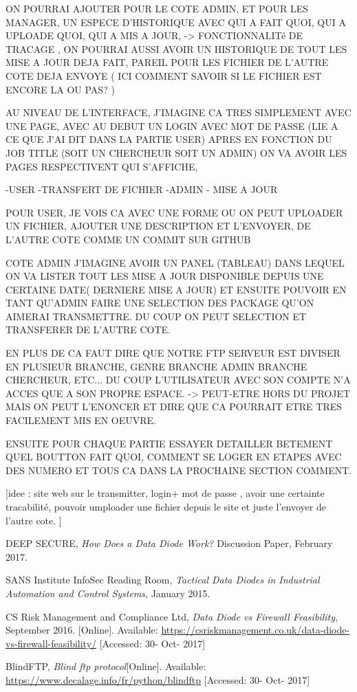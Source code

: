 \documentclass[a4paper,10pt]{article}
\begin{document}
ON POURRAI AJOUTER POUR LE COTE ADMIN, ET POUR LES MANAGER, UN ESPECE D'HISTORIQUE AVEC QUI A FAIT QUOI, QUI A UPLOADE QUOI, QUI A MIS A JOUR, -> FONCTIONNALITé DE TRACAGE , ON POURRAI AUSSI AVOIR UN HISTORIQUE DE TOUT LES MISE A JOUR DEJA FAIT, PAREIL POUR LES FICHIER DE L'AUTRE COTE DEJA ENVOYE ( ICI COMMENT SAVOIR SI LE FICHIER EST ENCORE LA OU PAS? )


AU NIVEAU DE L'INTERFACE, J'IMAGINE CA TRES SIMPLEMENT AVEC UNE PAGE, AVEC AU DEBUT UN LOGIN AVEC MOT DE PASSE (LIE A CE QUE J'AI DIT DANS LA PARTIE USER) APRES EN FONCTION DU JOB TITLE (SOIT UN CHERCHEUR SOIT UN ADMIN) ON VA AVOIR LES PAGES RESPECTIVENT QUI S'AFFICHE, 

-USER -TRANSFERT DE FICHIER
-ADMIN - MISE A JOUR

POUR USER, JE VOIS CA AVEC UNE FORME OU ON PEUT UPLOADER UN FICHIER, AJOUTER UNE DESCRIPTION ET L'ENVOYER, DE L'AUTRE COTE COMME UN COMMIT SUR GITHUB

COTE ADMIN J'IMAGINE AVOIR UN PANEL (TABLEAU) DANS LEQUEL ON VA LISTER TOUT LES MISE A JOUR DISPONIBLE DEPUIS UNE CERTAINE DATE( DERNIERE MISE A JOUR) ET ENSUITE POUVOIR EN TANT QU'ADMIN FAIRE UNE SELECTION DES PACKAGE QU'ON AIMERAI TRANSMETTRE. DU COUP ON PEUT SELECTION ET TRANSFERER DE L'AUTRE COTE.

EN PLUS DE CA FAUT DIRE QUE NOTRE FTP SERVEUR EST DIVISER EN PLUSIEUR BRANCHE, GENRE BRANCHE ADMIN BRANCHE CHERCHEUR, ETC... DU COUP L'UTILISATEUR AVEC SON COMPTE N'A ACCES QUE A SON PROPRE ESPACE. -> PEUT-ETRE HORS DU PROJET MAIS ON PEUT L'ENONCER ET DIRE QUE CA POURRAIT ETRE TRES FACILEMENT MIS EN OEUVRE.

ENSUITE POUR CHAQUE PARTIE ESSAYER DETAILLER BETEMENT QUEL BOUTTON FAIT QUOI, COMMENT SE LOGER EN ETAPES AVEC DES NUMERO ET TOUS CA DANS LA PROCHAINE SECTION COMMENT.


[idee : site web sur le transmitter, login+ mot de passe , avoir une certainte tracabilité, pouvoir umploader une fichier depuis le site et juste l'envoyer de l'autre cote. ]\\




\begin{thebibliography}{9}


DEEP SECURE,
\textit{How	Does a Data Diode Work?}
Discussion Paper, February 2017.

SANS Institute InfoSec Reading Room,
\textit{Tactical Data Diodes in Industrial Automation and Control Systems}, January 2015.

CS Risk Management and Compliance Ltd,
\textit{Data Diode vs Firewall Feasibility}, September 2016. [Online]. Available: \url{https://csriskmanagement.co.uk/data-diode-vs-firewall-feasibility/} [Accessed: 30- Oct- 2017]

BlindFTP,
\textit{Blind ftp protocol}[Online]. Available: \url{https://www.decalage.info/fr/python/blindftp} [Accessed: 30- Oct- 2017]

\end{thebibliography}
\end{document}
